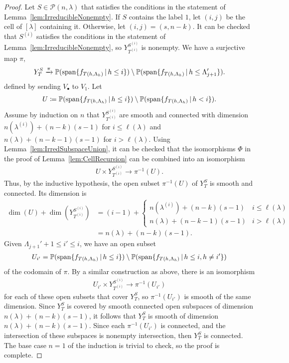 \documentclass[12pt]{amsart}
\newcommand{\st}{\,|\,}
\newcommand{\vspan}{\mathrm{span}}
\newcommand{\la}{\lambda}
\begin{document}
\begin{lemma}
    \begin{proof}
      Let $S\in \mathcal{P}(n,\la)$ that satisfies the conditions in the statement of Lemma~\ref{lem:IrreducibleNonempty}.  If $S$ contains the label $1$, let $(i,j)$ be the cell of $[\la]$ containing it. Otherwise, let $(i,j) = (s,n-k)$. It can be checked that $S^{(i)}$ satisfies the conditions in the statement of Lemma~\ref{lem:IrreducibleNonempty}, so $Y_{T^{(i)}}^{S^{(i)}}$ is nonempty. We have a surjective map $\pi$,
      \begin{align}
        Y_T^S \xrightarrow{\pi} \bP(\vspan\{f_{T(h,\Lambda_h)} \st h\leq i\}) \setminus \bP(\vspan\{f_{T(h,\Lambda_h)}\st h\leq \Lambda_{j+1}'\}).
      \end{align}
      defined by sending $V_\bullet$ to $V_1$. Let
      \begin{align}
        U \coloneqq \bP(\vspan\{f_{T(h,\Lambda_h)} \st h\leq i\}) \setminus \bP(\vspan\{f_{T(h,\Lambda_h)}\st h < i\}).
      \end{align}
      Assume by induction on $n$ that $Y_{T^{(i)}}^{S^{(i)}}$ are smooth and connected with dimension $n(\la^{(i)})+(n-k)(s-1)$ for $i\leq \ell(\la)$ and $n(\la)+(n-k-1)(s-1)$ for $i>\ell(\la)$.  Using Lemma~\ref{lem:IrredSubspaceUnion}, it can be checked that the isomorphisms $\Phi$ in the proof of Lemma~\ref{lem:CellRecursion} can be combined into an isomorphism
      \begin{align}
        U\times Y_{T^{(i)}}^{S^{(i)}} \to \pi^{-1}(U).
      \end{align}
     Thus, by the inductive hypothesis, the open subset $\pi^{-1}(U)$ of $Y_T^S$ is smooth and connected. Its dimension is
      \begin{align}
        \dim(U) + \dim(Y_{T^{(i)}}^{S^{(i)}}) &= (i-1) + \begin{cases} n(\la^{(i)}) + (n-k)(s-1) & i\leq \ell(\la)\\ n(\la) + (n-k-1)(s-1) & i>\ell(\la)\end{cases}\\
        &= n(\la) + (n-k)(s-1).
      \end{align}
      Given $\Lambda_{j+1}'+1\leq i' \leq i$, we have an open subset
      \begin{align}
        U_{i'} = \bP(\vspan\{f_{T(h,\Lambda_h)}\st h\leq i\})\setminus \bP(\vspan\{f_{T(h,\Lambda_h)}\st h\leq i, h\neq i'\})
      \end{align}
      of the codomain of $\pi$. By a similar construction as above, there is an isomorphism
      \begin{align}
        U_{i'}\times Y_{T^{(i)}}^{S^{(i)}}\to \pi^{-1}(U_{i'})
      \end{align}
      for each of these open subsets that cover $Y_T^S$, so $\pi^{-1}(U_{i'})$ is smooth of the same dimension. Since $Y_T^S$ is covered by smooth connected open subspaces of dimension $n(\la)+(n-k)(s-1)$, it follows that $Y_T^S$ is smooth of dimension $n(\la)+(n-k)(s-1)$. Since each $\pi^{-1}(U_{i'})$ is connected, and the intersection of these subspaces is nonempty intersection, then $Y_T^S$ is connected. The base case $n=1$ of the induction is trivial to check, so the proof is complete.
    \end{proof}


\end{lemma}
\end{document}
